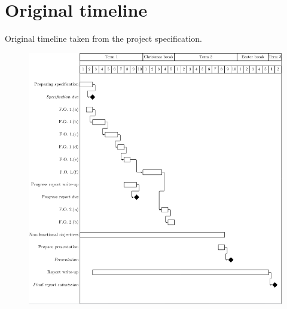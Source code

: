 \chapter{Original timeline}

Original timeline taken from the project specification.

\label{originalTimeline}

\begin{figure}[h]
    \centering
    \includegraphics[width=\textwidth]{imgs/Screenshot from 2022-04-05 16-16-55.png}
\end{figure}